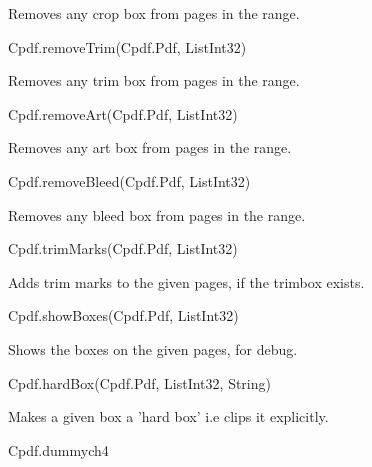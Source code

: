 Removes any crop box from pages in the range.


Cpdf.removeTrim(Cpdf.Pdf, List{Int32})


Removes any trim box from pages in the range.


Cpdf.removeArt(Cpdf.Pdf, List{Int32})


Removes any art box from pages in the range.


Cpdf.removeBleed(Cpdf.Pdf, List{Int32})


Removes any bleed box from pages in the range.


Cpdf.trimMarks(Cpdf.Pdf, List{Int32})


Adds trim marks to the given pages, if the
trimbox exists.


Cpdf.showBoxes(Cpdf.Pdf, List{Int32})


Shows the boxes on the given pages, for debug.


Cpdf.hardBox(Cpdf.Pdf, List{Int32}, String)


Makes a given box a 'hard box' i.e clips it explicitly.


Cpdf.dummych4

